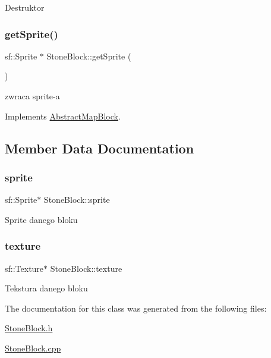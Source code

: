 Destruktor \mbox{\label{class_stone_block_aa2e4adb1d50d9f326ffe427bcdd6d7bb}} 
\subsubsection{\texorpdfstring{get\+Sprite()}{getSprite()}}
{\footnotesize\ttfamily sf\+::\+Sprite $\ast$ Stone\+Block\+::get\+Sprite (\begin{DoxyParamCaption}{ }\end{DoxyParamCaption})\hspace{0.3cm}{\ttfamily [virtual]}}

zwraca sprite-\/a 

Implements \hyperlink{class_abstract_map_block_ab5a448a1b6478d10a8814c6d19c4fdb4}{Abstract\+Map\+Block}.



\subsection{Member Data Documentation}
\mbox{\label{class_stone_block_a1d66339d3e42126e72130dd6863d30b5}} 
\subsubsection{\texorpdfstring{sprite}{sprite}}
{\footnotesize\ttfamily sf\+::\+Sprite$\ast$ Stone\+Block\+::sprite\hspace{0.3cm}{\ttfamily [protected]}}

Sprite danego bloku \mbox{\label{class_stone_block_a86062896e0fedaad3bedbbd52641f76b}} 
\subsubsection{\texorpdfstring{texture}{texture}}
{\footnotesize\ttfamily sf\+::\+Texture$\ast$ Stone\+Block\+::texture\hspace{0.3cm}{\ttfamily [protected]}}

Tekstura danego bloku 

The documentation for this class was generated from the following files\+:\begin{DoxyCompactItemize}
\item 
\hyperlink{_stone_block_8h}{Stone\+Block.\+h}\item 
\hyperlink{_stone_block_8cpp}{Stone\+Block.\+cpp}\end{DoxyCompactItemize}
